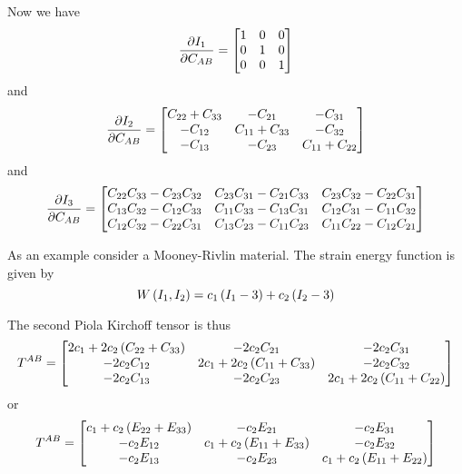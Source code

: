 Now we have
\begin{equation}
   \dfrac{\partial I_{1}}{\partial C_{AB}} =\begin{bmatrix}
    1 & 0 & 0 \\
    0 & 1 & 0 \\
    0 & 0 & 1
  \end{bmatrix}
\end{equation}
and
\begin{equation}
   \dfrac{\partial I_{2}}{\partial C_{AB}} =\begin{bmatrix}
    C_{22}+C_{33} & -C_{21} & -C_{31} \\
    -C_{12} & C_{11}+C_{33} & -C_{32} \\
    -C_{13} & -C_{23} & C_{11}+C_{22}
  \end{bmatrix}
\end{equation}
and
\begin{equation}
   \dfrac{\partial I_{3}}{\partial C_{AB}} =\begin{bmatrix}
    C_{22}C_{33}-C_{23}C_{32} & C_{23}C_{31}-C_{21}C_{33} & C_{23}C_{32}-C_{22}C_{31} \\
    C_{13}C_{32}-C_{12}C_{33} & C_{11}C_{33}-C_{13}C_{31} & C_{12}C_{31}-C_{11}C_{32} \\
    C_{12}C_{32}-C_{22}C_{31} & C_{13}C_{23}-C_{11}C_{23} & C_{11}C_{22}-C_{12}C_{21}
  \end{bmatrix}
\end{equation}

As an example consider a Mooney-Rivlin material. The strain energy function is
given by
\begin{equation}
   W\left( I_{1},I_{2} \right) =c_{1}\left( I_{1}-3 \right)+c_{2}\left( I_{2}-3 \right)
\end{equation}

The second Piola Kirchoff tensor is thus
\begin{equation}
  T^{AB}=\begin{bmatrix}
    2c_{1}+2c_{2}\left( C_{22}+C_{33} \right) & -2c_{2}C_{21} & -2c_{2}C_{31} \\
    -2c_{2}C_{12} & 2c_{1}+2c_{2}\left( C_{11}+C_{33} \right) & -2c_{2}C_{32} \\
    -2c_{2}C_{13} & -2c_{2}C_{23} & 2c_{1}+2c_{2}\left( C_{11}+C_{22} \right)
  \end{bmatrix}
\end{equation}
or
\begin{equation}
  T^{AB}=\begin{bmatrix}
    c_{1}+c_{2}\left( E_{22}+E_{33} \right) & -c_{2}E_{21} & -c_{2}E_{31} \\
    -c_{2}E_{12} & c_{1}+c_{2}\left( E_{11}+E_{33} \right) & -c_{2}E_{32} \\
    -c_{2}E_{13} & -c_{2}E_{23} & c_{1}+c_{2}\left( E_{11}+E_{22} \right)
  \end{bmatrix}
\end{equation}

